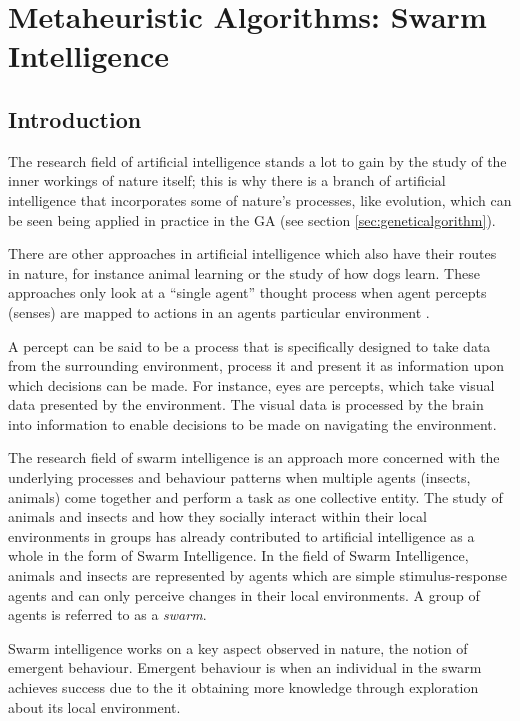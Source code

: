 \chapter[Swarm Intelligence]{Metaheuristic Algorithms: Swarm Intelligence}
\label{chpt:swarm}
\section{Introduction}
The research field of artificial intelligence stands a lot to gain by the study of the inner workings of nature itself; this is why there is a branch of artificial intelligence that incorporates some of nature's processes, like evolution, which can be seen being applied in practice in the \gls{GA} (see section \ref{sec:geneticalgorithm}).

 There are other approaches in artificial intelligence which also have their routes in nature, for instance animal learning or the study of how dogs learn\cite{DLearning}. These approaches only look at a “single agent” thought process when agent percepts (senses) are mapped to actions in an agents particular environment \cite{DLearning}. 
 
 A percept can be said to be a process that is specifically designed to take data from the surrounding environment, process it and present it as information upon which decisions can be made\cite{DLearning,AIModernApproach}. For instance, eyes are percepts, which take visual data presented by the environment\cite{DLearning,AIModernApproach}. The visual data is processed by the brain into information to enable decisions to be made on navigating the environment\cite{DLearning,AIModernApproach}.

The research field of swarm intelligence is an approach more concerned with the underlying processes and behaviour patterns when multiple agents (insects, animals) come together and perform a task as one collective entity\cite{DLearning,AIModernApproach}.  The study of animals and insects and how they socially interact within their local environments in groups has already contributed to artificial intelligence as a whole in the form of Swarm Intelligence\cite{ChaoticSwarmIntel,BeeJobShop}.  In the field of Swarm Intelligence, animals and insects are represented by agents which are simple stimulus-response agents and can only perceive changes in their local environments. A group of agents is referred to as a \emph{swarm}.

Swarm intelligence works on a key aspect observed in nature, the notion of emergent behaviour\cite{SwarmArt,FundamentalSwarm}. Emergent behaviour is when an individual in the swarm achieves success due to the it obtaining more knowledge through exploration about its local environment\cite{SwarmArt,FundamentalSwarm}.


